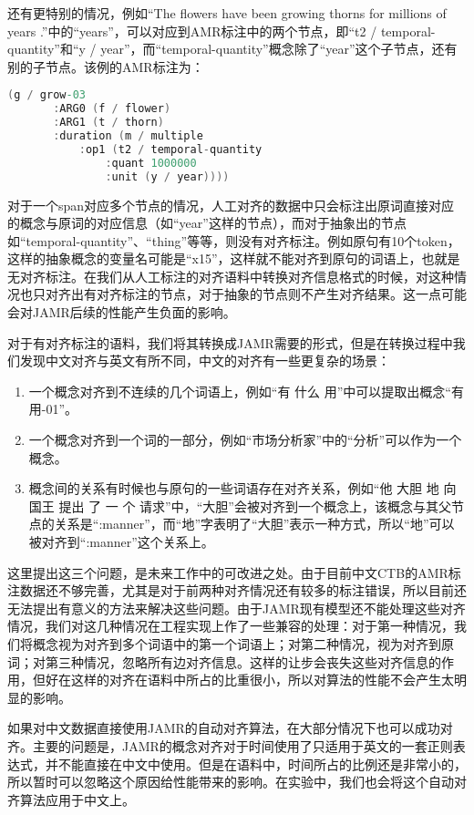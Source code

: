 \documentclass[master, winfont]{njuthesis}
\begin{document}
还有更特别的情况，例如“The flowers have been growing thorns for millions of years .”中的“years”，可以对应到AMR标注中的两个节点，即“t2 / temporal-quantity”和“y / year”，而“temporal-quantity”概念除了“year”这个子节点，还有别的子节点。该例的AMR标注为：
\begin{lstlisting}[language=C]
   (g / grow-03
       :ARG0 (f / flower)
       :ARG1 (t / thorn)
       :duration (m / multiple
           :op1 (t2 / temporal-quantity
               :quant 1000000
               :unit (y / year))))
\end{lstlisting}
                        
对于一个span对应多个节点的情况，人工对齐的数据中只会标注出原词直接对应的概念与原词的对应信息（如“year”这样的节点），而对于抽象出的节点如“temporal-quantity”、“thing”等等，则没有对齐标注。例如原句有10个token，这样的抽象概念的变量名可能是“x15”，这样就不能对齐到原句的词语上，也就是无对齐标注。在我们从人工标注的对齐语料中转换对齐信息格式的时候，对这种情况也只对齐出有对齐标注的节点，对于抽象的节点则不产生对齐结果。这一点可能会对JAMR后续的性能产生负面的影响。

对于有对齐标注的语料，我们将其转换成JAMR需要的形式，但是在转换过程中我们发现中文对齐与英文有所不同，中文的对齐有一些更复杂的场景：

\begin{enumerate}
	\item 一个概念对齐到不连续的几个词语上，例如“有 什么 用”中可以提取出概念“有用-01”。
	\item 一个概念对齐到一个词的一部分，例如“市场分析家”中的“分析”可以作为一个概念。
	\item 概念间的关系有时候也与原句的一些词语存在对齐关系，例如“他 大胆 地 向 国王 提出 了 一 个 请求”中，“大胆”会被对齐到一个概念上，该概念与其父节点的关系是“:manner”，而“地”字表明了“大胆”表示一种方式，所以“地”可以被对齐到“:manner”这个关系上。
\end{enumerate}

这里提出这三个问题，是未来工作中的可改进之处。由于目前中文CTB的AMR标注数据还不够完善，尤其是对于前两种对齐情况还有较多的标注错误，所以目前还无法提出有意义的方法来解决这些问题。由于JAMR现有模型还不能处理这些对齐情况，我们对这几种情况在工程实现上作了一些兼容的处理：对于第一种情况，我们将概念视为对齐到多个词语中的第一个词语上；对第二种情况，视为对齐到原词；对第三种情况，忽略所有边对齐信息。这样的让步会丧失这些对齐信息的作用，但好在这样的对齐在语料中所占的比重很小，所以对算法的性能不会产生太明显的影响。

如果对中文数据直接使用JAMR的自动对齐算法，在大部分情况下也可以成功对齐。主要的问题是，JAMR的概念对齐对于时间使用了只适用于英文的一套正则表达式，并不能直接在中文中使用。但是在语料中，时间所占的比例还是非常小的，所以暂时可以忽略这个原因给性能带来的影响。在实验中，我们也会将这个自动对齐算法应用于中文上。
\end{document}
